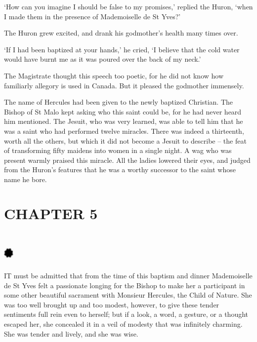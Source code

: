 \documentclass{article}
\begin{document}
\begin{center}
`How can you imagine I should be false to my promises,' replied the Huron, `when 
I made them in the presence of Mademoiselle de St Yves?' 

The Huron grew excited, and drank his godmother's health many times over. 

`If I had been baptized at your hands,' he cried, `I believe that the cold water 
would have burnt me as it was poured over the back of my neck.' 

The Magistrate thought this speech too poetic, for he did not know how familiarly 
allegory is used in Canada. But it pleased the godmother immensely. 

The name of Hercules had been given to the newly baptized Christian. The Bishop 
of St Malo kept asking who this saint could be, for he had never heard him mentioned. 
The Jesuit, who was very learned, was able to tell him that he was a saint who 
had performed twelve miracles. There was indeed a thirteenth, worth all the others, 
but which it did not become a Jesuit to describe – the feat of transforming fifty 
maidens into women in a single night. A wag who was present warmly praised this 
miracle. All the ladies lowered their eyes, and judged from the Huron's features 
that he was a worthy successor to the saint whose name he bore.\pagebreak{} 

\section*{\textbf{CHAPTER 5 }}

\section*{%
\includegraphics[width=14pt, height=15pt, keepaspectratio=true]{Zadig or L'Ingenu - Voltaire-fig027.jpg}
}

 

IT must be admitted that from the time of this baptism and dinner Mademoiselle 
de St Yves felt a passionate longing for the Bishop to make her a participant in 
some other beautiful sacrament with Monsieur Hercules, the Child of Nature. She 
was too well brought up and too modest, however, to give these tender sentiments 
full rein even to herself; but if a look, a word, a gesture, or a thought escaped 
her, she concealed it in a veil of modesty that was infinitely charming. She was 
tender and lively, and she was wise. 


\end{center}
\end{document}
